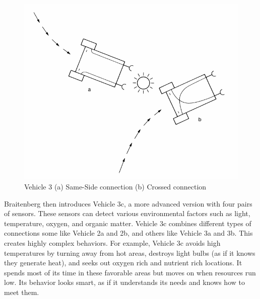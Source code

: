 \documentclass{article}
\begin{document}
    \begin{figure}[h]
		\centering
		\includegraphics[scale=0.5]{images/Vehicle_3a_3b.png}
		\caption{Vehicle 3 (a) Same-Side connection (b) Crossed connection }
		\label{fig:vehicle-3ab}
	\end{figure}

    Braitenberg then introduces Vehicle 3c, a more advanced version with four pairs of sensors. These sensors can detect various environmental factors such as light, temperature, oxygen, and organic matter. Vehicle 3c combines different types of connections some like Vehicle 2a and 2b, and others like Vehicle 3a and 3b. This creates highly complex behaviors. For example, Vehicle 3c avoids high temperatures by turning away from hot areas, destroys light bulbs (as if it knows they generate heat), and seeks out oxygen rich and nutrient rich locations. It spends most of its time in these favorable areas but moves on when resources run low. Its behavior looks smart, as if it understands its needs and knows how to meet them.

    \newpage
\end{document}
